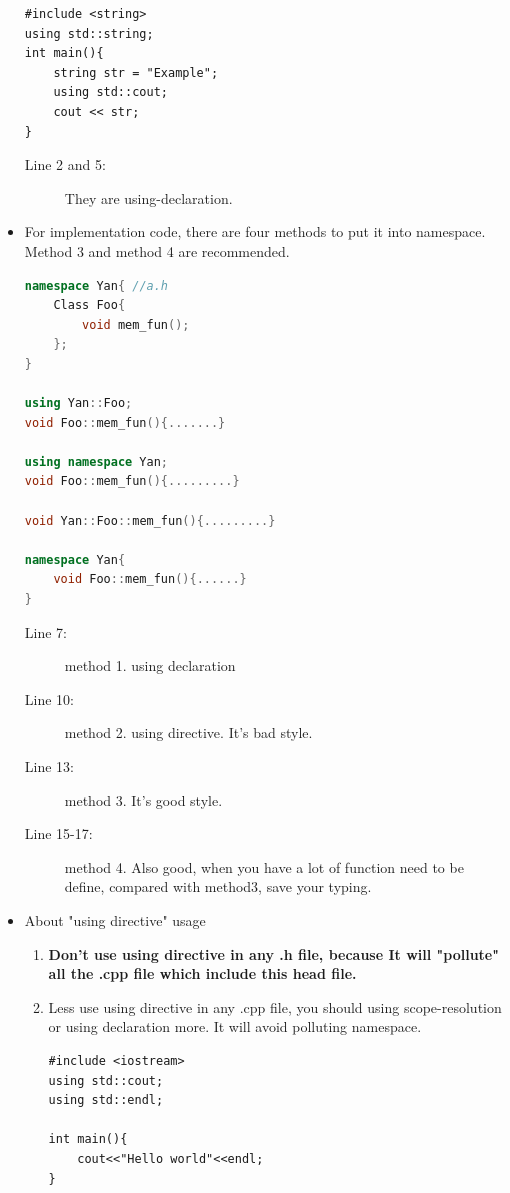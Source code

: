 \documentclass[a4paper,11pt,twoside]{book}
\begin{document}
\begin{itemize}
\begin{lstlisting}
#include <string>
using std::string;
int main(){
	string str = "Example";
	using std::cout;
	cout << str;
}
\end{lstlisting}
\begin{description}
	\item[Line 2 and 5:] They are using-declaration.
\end{description}
	
	\item For implementation code, there are four methods to put it into namespace. Method 3 and method 4 are recommended.
	
\begin{lstlisting}[frame=single, language=c++]
namespace Yan{ //a.h
	Class Foo{
		void mem_fun();
	};
}
	
using Yan::Foo;
void Foo::mem_fun(){.......}
	
using namespace Yan;
void Foo::mem_fun(){.........}
	
void Yan::Foo::mem_fun(){.........}

namespace Yan{ 
	void Foo::mem_fun(){......}
}
\end{lstlisting}
\begin{description}
	\item[Line 7:]method 1. using declaration
	\item[Line 10:]method 2. using directive. It's bad style.
	\item[Line 13:]method 3. It's good style.
	\item[Line 15-17:]method 4. Also good, when you have a lot of function need to be define, compared with method3, save your typing.
\end{description}
	
	\item About "using directive" usage
	\begin{enumerate}
		\item  \textbf{Don't use using directive in any .h file,  because It will "pollute" all the .cpp file which include this head file.}
		
		\item  Less use using directive in any .cpp file, you should using scope-resolution or using declaration more. It will avoid polluting namespace.
\begin{lstlisting}[numbers=none]
#include <iostream>
using std::cout;
using std::endl;

int main(){
	cout<<"Hello world"<<endl;
}
\end{lstlisting}
		

\end{enumerate}
\end{itemize}
\end{document}
